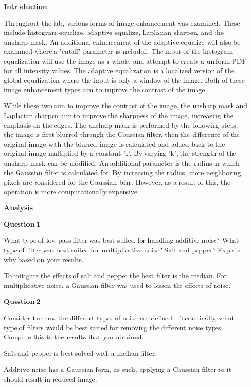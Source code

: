 \documentclass[
]{article}
\begin{document}
\pagebreak
\textbf{Introduction}

Throughout the lab, various forms of image enhancement was examined. These include histogram equalize, adaptive equalize, Laplacian sharpen, and the unsharp mask. An additional enhancement of the adaptive equalize will also be examined where a 'cutoff' parameter is included. The input of the histogram equalization will use the image as a whole, and attempt to create a uniform PDF for all intensity values. The adaptive equalization is a localized version of the global equalization where the input is only a window of the image. Both of these image enhancement types aim to improve the contrast of the image.

While these two aim to improve the contrast of the image, the unsharp mask and Laplacian sharpen aim to improve the sharpness of the image, increasing the emphasis on the edges. The unsharp mask is performed by the following steps: the image is first blurred through the Gaussian filter, then the difference of the original image with the blurred image is calculated and added back to the original image multiplied by a constant 'k'. By varying 'k', the strength of the unsharp mask can be modified. An additional parameter is the radius in which the Gaussian filter is calculated for. By increasing the radius, more neighboring pixels are considered for the Gaussian blur. However, as a result of this, the operation is more computationally expensive.

\pagebreak

\textbf{Analysis}

\textbf{Question 1}

What type of low-pass filter was best suited for handling additive noise? What type of filter was best suited for multiplicative noise? Salt and pepper? Explain why based on your results.

To mitigate the effects of salt and pepper the best filter is the median. For multiplicative noise, a Gaussian filter was used to lessen the effects of noise.
 
\textbf{Question 2}

Consider the how the different types of noise are defined. Theoretically, what type of filters would be best suited for removing the different noise types. Compare this to the results that you obtained.

Salt and pepper is best solved with a median filter. 

Additive noise has a Gaussian form, as such, applying a Gaussian filter to it should result in reduced image.
\end{document}
